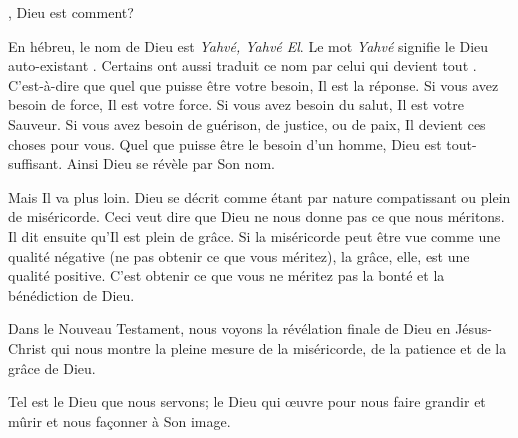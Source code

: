\dvrule






, Dieu est comment?

En hébreu, le nom de Dieu est \emph{Yahvé, Yahvé El}.
 Le mot \emph{Yahvé} signifie le \og Dieu auto-existant \fg{}.
 Certains ont aussi traduit ce nom par \og celui qui devient tout \fg{}.
 C'est-à-dire que quel que puisse être votre besoin, Il est la réponse.
 Si vous avez besoin de force, Il est votre force.
 Si vous avez besoin du salut, Il est votre Sauveur.
 Si vous avez besoin de guérison, de justice, ou de paix,
 Il devient ces choses pour vous.
 Quel que puisse être le besoin d'un homme, Dieu est tout-suffisant.
 Ainsi Dieu se révèle par Son nom.

Mais Il va plus loin. Dieu se décrit comme étant par nature compatissant
 ou plein de miséricorde. Ceci veut dire que Dieu ne nous donne pas
 ce que nous méritons.
 Il dit ensuite qu'Il est plein de grâce.
 Si la miséricorde peut être vue comme une qualité négative
 (ne pas obtenir ce que vous méritez), la grâce, elle, est une qualité positive.
 C'est obtenir ce que vous ne méritez pas
 \ocadr{}la bonté et la bénédiction de Dieu.


Dans le Nouveau Testament, nous voyons la révélation finale de Dieu
 en Jésus-Christ qui nous montre la pleine mesure de la miséricorde,
 de la patience et de la grâce de Dieu.

Tel est le Dieu que nous servons; le Dieu qui œuvre pour nous faire grandir
 et mûrir et nous façonner à Son image. 

\dvrule




